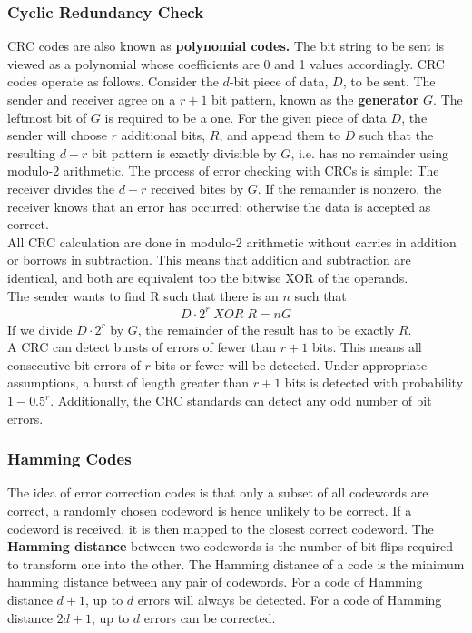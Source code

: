 \subsubsection{Cyclic Redundancy Check}
CRC codes are also known as \textbf{polynomial codes.} The bit string to be sent is viewed as a polynomial whose coefficients are 0 and 1 values accordingly. CRC codes operate as follows. Consider the $d$-bit piece of data, $D$, to be sent. The sender and receiver agree on a $r+1$ bit pattern, known as the \textbf{generator} $G$. The leftmost bit of $G$ is required to be a one. For the given piece of data $D$, the sender will choose $r$ additional bits, $R$, and append them to $D$ such that the resulting $d + r$ bit pattern is exactly divisible by $G$, i.e. has no remainder using modulo-2 arithmetic. The process of error checking with CRCs is simple: The receiver divides the $d + r$ received bites by $G$. If the remainder is nonzero, the receiver knows that an error has occurred; otherwise the data is accepted as correct. \\
All CRC calculation are done in modulo-2 arithmetic without carries in addition or borrows in subtraction. This means that addition and subtraction are identical, and both are equivalent too the bitwise XOR of the operands. \\
The sender wants to find R such that there is an $n$ such that
\begin{align*}
D \cdot 2^r \; XOR\;R = nG
\end{align*}
If we divide $D \cdot 2^r$ by $G$, the remainder of the result has to be exactly $R$.\vspace{.3cm}\\
A CRC can detect bursts of errors of fewer than $r + 1$ bits. This means all consecutive bit errors of $r$ bits or fewer will be detected. Under appropriate assumptions, a burst of length greater than $r+1$ bits is detected with probability $1 - 0.5^r$. Additionally, the CRC standards can detect any odd number of bit errors.

\subsubsection{Hamming Codes}
The idea of error correction codes is that only a subset of all codewords are correct, a randomly chosen codeword is hence unlikely to be correct. If a codeword is received, it is then mapped to the closest correct codeword. The \textbf{Hamming distance} between two codewords is the number of bit flips required to transform one into the other. The Hamming distance of a code is the minimum hamming distance between any pair of codewords. For a code of Hamming distance $d + 1$, up to $d$ errors will always be detected. For a code of Hamming distance $2d + 1$, up to $d$ errors can be corrected.\vspace{.3cm}\\


